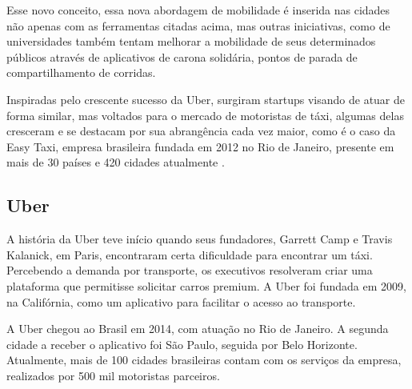 Esse novo conceito, essa nova abordagem de mobilidade é inserida nas cidades não apenas com as ferramentas citadas acima, mas outras iniciativas, como de universidades também tentam melhorar a mobilidade de seus determinados públicos através de aplicativos de carona solidária, pontos de parada de compartilhamento de corridas.

Inspiradas pelo crescente sucesso da Uber, surgiram startups visando de atuar de forma similar, mas voltados para o mercado de motoristas de táxi, algumas delas cresceram e se destacam por sua abrangência cada vez maior, como é o caso da Easy Taxi, empresa brasileira fundada em 2012 no Rio de Janeiro, presente em mais de 30 países e 420 cidades atualmente \cite{caronae}.

\subsection{Uber}
A história da Uber teve início quando seus fundadores, Garrett Camp e Travis Kalanick, em Paris, encontraram certa dificuldade para encontrar um táxi. Percebendo a demanda por transporte, os executivos resolveram criar uma plataforma que permitisse solicitar carros premium. A Uber foi fundada em 2009, na Califórnia, como um aplicativo para facilitar o acesso ao transporte.

A Uber chegou ao Brasil em 2014, com atuação no Rio de Janeiro. A segunda cidade a receber o aplicativo foi São Paulo, seguida por Belo Horizonte. Atualmente, mais de 100 cidades brasileiras contam com os serviços da empresa, realizados por 500 mil motoristas parceiros. 


